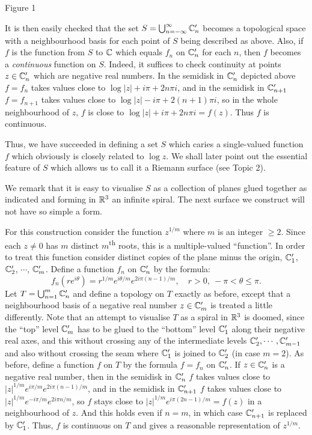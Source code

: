 \documentclass[a4paper,11pt]{article}
\begin{document}
\begin{mdframed}
  \vspace{1in}  

  Figure 1
\end{mdframed}



It is then easily checked that the set $S = \bigcup_{n=-\infty}^\infty
{\mathbb C}_n'$ becomes a topological space with a neighbourhood basis for
each point of $S$ being described as above.  Also, if $f$ is the
function from $S$ to ${\mathbb C}$ which equals $f_n$ on ${\mathbb C}_n'$ for each
$n$, then $f$ becomes a \emph{continuous} function on $S$.  Indeed, it
suffices to check continuity at points $z \in {\mathbb C}_n'$ which are
negative real numbers.  In the semidisk in ${\mathbb C}_n'$ depicted above $f
= f_n$ takes values close to $\log|z| + i\pi + 2n\pi i$, and in the
semidisk in ${\mathbb C}_{n+1}'$ $f=f_{n+1}$ takes values close to $\log|z| -
i\pi + 2(n+1)\pi i$, so in the whole neighbourhood of $z$, $f$ is
close to $\log|z| + i\pi + 2n\pi i = f(z)$.  Thus $f$ is continuous.

Thus, we have succeeded in defining a set $S$ which caries a
single-valued function $f$ which obviously is closely related to $\log
z$.  We shall later point out the essential feature of $S$ which
allows us to call it a Riemann surface (see Topic 2).

We remark that it is easy to visualise $S$ as a collection of planes
glued together as indicated and forming in ${\mathbb R}^3$ an infinite
spiral.  The next surface we construct will not have so simple a
form.

For this construction consider the function $z^{1/m}$ where $m$ is an
integer $\ge 2$.  Since each $z\ne 0$ has $m$ distinct
$m$\textsuperscript{th} roots, this is a multiple-valued
``function''.  In order to treat this function consider distinct
copies of the plane minus the origin, ${\mathbb C}_1'$, ${\mathbb C}_2'$, $\cdots$,
${\mathbb C}_m'$.  Define a function $f_n$ on ${\mathbb C}_n'$ by the formula:
$$
f_n(re^{i\theta}) = r^{1/m}e^{i\theta/m} e^{2i\pi(n-1)/m},\quad r>0,\ 
-\pi < \theta \le \pi.
$$
Let $T = \bigcup_{n=1}^m {\mathbb C}_n'$ and define a topology on $T$ exactly
as before, except that a neighbourhood basis of a negative real number
$z \in {\mathbb C}_m'$ is treated a little differently.  Note that an attempt
to visualise $T$ as a spiral in ${\mathbb R}^3$ is doomed, since the ``top''
level ${\mathbb C}_m'$ has to be glued to the ``bottom'' level ${\mathbb C}_1'$
along their negative real axes, and this without crossing any of the
intermediate levels ${\mathbb C}_2', \cdots, {\mathbb C}_{m-1}'$ and also without
crossing the seam where ${\mathbb C}_1'$ is joined to ${\mathbb C}_2'$ (in case
$m=2$).  As before, define a function $f$ on $T$ by the formula $f =
f_n$ on ${\mathbb C}_n'$.  If $z \in {\mathbb C}_n'$ is a negative real number, then
in the semidisk in ${\mathbb C}_n'$ $f$ takes values close to $|z|^{1/m}
e^{i\pi/m} e^{2i\pi(n-1)/m}$, and in the semidisk in ${\mathbb C}_{n+1}'$ $f$
takes values close to $|z|^{1/m} e^{-i\pi/m} e^{2i\pi n/m}$, so $f$
stays close to $|z|^{1/m} e^{i\pi(2n-1)/m} = f(z)$ in a neighbourhood
of $z$.  And this holds even if $n=m$, in which case ${\mathbb C}_{n+1}'$ is
replaced by ${\mathbb C}_1'$.  Thus, $f$ is continuous on $T$ and gives a
reasonable representation of $z^{1/m}$.
\end{document}

